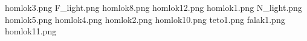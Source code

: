 homlok3.png
F_light.png
homlok8.png
homlok12.png
homlok1.png
N_light.png
homlok5.png
homlok4.png
homlok2.png
homlok10.png
teto1.png
falak1.png
homlok11.png
